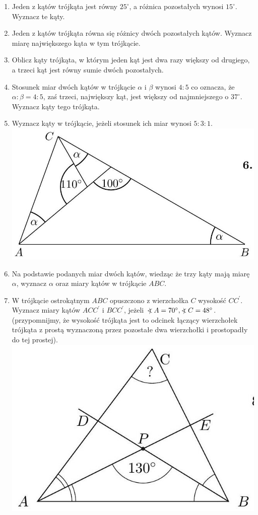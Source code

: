 \documentclass[10pt]{article}
\newcommand\Varangle{\mathop{{<\!\!\!\!\!\text{\small)}}\:}\nolimits}
\begin{document}
\begin{enumerate}
  \item Jeden z kątów trójkąta jest równy \(25^{\circ}\), a różnica pozostałych wynosi \(15^{\circ}\). Wyznacz te kąty.
  \item Jeden z kątów trójkąta równa się różnicy dwóch pozostałych kątów. Wyznacz miarę największego kąta w tym trójkącie.
  \item Oblicz kąty trójkąta, w którym jeden kąt jest dwa razy większy od drugiego, a trzeci kąt jest równy sumie dwóch pozostałych.
  \item Stosunek miar dwóch kątów w trójkącie \(\alpha\) i \(\beta\) wynosi \(4: 5\) co oznacza, że \(\alpha: \beta=4: 5\), zaś trzeci, największy kąt, jest większy od najmniejszego o \(37^{\circ}\). Wyznacz kąty tego trójkąta.
  \item Wyznacz kąty w trójkącie, jeżeli stosunek ich miar wynosi \(5: 3: 1\).\\
\includegraphics[max width=\textwidth, center]{2024_11_21_71f62bd117d375398909g-018(1)}
  \item Na podstawie podanych miar dwóch kątów, wiedząc że trzy kąty mają miarę \(\alpha\), wyznacz \(\alpha\) oraz miary kątów w trójkącie \(A B C\).
  \item W trójkącie ostrokątnym \(A B C\) opuszczono z wierzchołka \(C\) wysokość \(C C^{\prime}\). Wyznacz miary kątów \(A C C^{\prime}\) i \(B C C^{\prime}\), jeżeli \(\Varangle A=70^{\circ}, \Varangle C=48^{\circ}\). (przypomnijmy, że wysokość trójkąta jest to odcinek łączący wierzchołek trójkąta z prostą wyznaczoną przez pozostałe dwa wierzchołki i prostopadły do tej prostej).\\
\includegraphics[max width=\textwidth, center]{2024_11_21_71f62bd117d375398909g-019(2)}

\end{enumerate}
\end{document}
